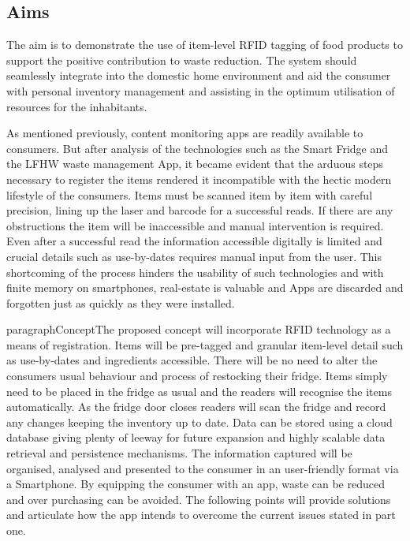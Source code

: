 \documentclass[a4paper, 11pt]{article}
\begin{document}
{\subsection{Aims}

The aim is to demonstrate the use of item-level RFID tagging of food products to support the positive contribution to waste reduction. The system should seamlessly integrate into the domestic home environment and aid the consumer with personal inventory management and assisting in the optimum utilisation of resources for the inhabitants. 

As mentioned previously, content monitoring apps are readily available to consumers. But after analysis of the technologies such as the Smart Fridge and the LFHW waste management App, it became evident that the arduous steps necessary to register the items rendered it incompatible with the hectic modern lifestyle of the consumers. Items must be scanned item by item with careful precision, lining up the laser and barcode for a successful reads. If there are any obstructions the item will be inaccessible and manual intervention is required. Even after a successful read the information accessible digitally is limited and crucial details such as use-by-dates requires manual input from the user. This shortcoming of the process hinders the usability of such technologies and with finite memory on smartphones, real-estate is valuable and Apps are discarded and forgotten just as quickly as they were installed.

paragraph{Concept}The proposed concept will incorporate RFID technology as a means of registration. Items will be pre-tagged and granular item-level detail such as use-by-dates and ingredients accessible. There will be no need to alter the consumers usual behaviour and process of restocking their fridge. Items simply need to be placed in the fridge as usual and the readers will recognise the items automatically. As the fridge door closes readers will scan the fridge and record any changes keeping the inventory up to date. Data can be stored using a cloud database giving plenty of leeway for future expansion and highly scalable data retrieval and persistence mechanisms. The information captured will be organised, analysed and presented to the consumer in an user-friendly format via a Smartphone. By equipping the consumer with an app, waste can be reduced and over purchasing can be avoided. The following points will provide solutions and articulate how the app intends to overcome the current issues stated in part one.

}
\end{document}
